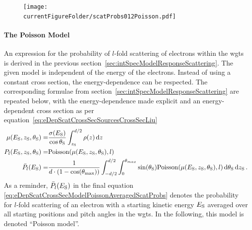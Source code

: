 \begin{figure}[th]
\texttt{[image: \\currentFigureFolder/scatProbs012Poisson.pdf]}
        \label{fig:eDepScatCrossSecModel}
\end{figure}

\paragraph{The Poisson Model}
An expression for the probability of $l$-fold scattering of electrons within the \gls{wgts} is derived in the previous section~\ref{sec:intSpecModelResponseScattering}. The given model is independent of the energy of the electrons. Instead of using a constant cross section, the energy-dependence can be respected. The corresponding formulae from section~\ref{sec:intSpecModelResponseScattering} are repeated below, with the energy-dependence made explicit and an energy-dependent cross section as per equation~\eqref{eq:eDepScatCrossSecSourcesCrossSecLiu}
\begin{subequations}
\label{eq:eDepScatCrossSecModelPoisson}
\begin{align}
    \mu(E_\mathrm{S},z_\mathrm{S},\theta_\mathrm{S}) =&
    \frac{\sigma(E_\mathrm{S})}{\cos\theta_\mathrm{S}}
    \int_{z_\mathrm{S}}^{d/2} \rho(z)\mathop{}\!\mathrm{d} z \label{eq:energydepScatProbsPoissonExpectedScatCount} \\
    P_l(E_\mathrm{S},z_\mathrm{S},\theta_\mathrm{S}) =&
    \mathrm{Poisson}(\mu(E_\mathrm{S},z_\mathrm{S},\theta_\mathrm{S}),l) \label{eq:eDepScatCrossSecModelPoissonNonAveragedScatProbs} \\
    \bar{P}_l(E_\mathrm{S}) =&
    \frac{1}{d \cdot (1-\cos(\theta_\mathrm{max}))} 
      \int_{-d/2}^{d/2}  
          \int_{0}^{\theta_{max}} 
            \sin(\theta_\mathrm{S})
            \mathrm{Poisson}(\mu(E_\mathrm{S},z_\mathrm{S},\theta_\mathrm{S}),l)
          \mathop{}\!\mathrm{d}\theta_\mathrm{S}
      \mathop{}\!\mathrm{d}z_\mathrm{S}
      \label{eq:eDepScatCrossSecModelPoissonAveragedScatProbs}
    \text{\,.}
\end{align}
\end{subequations}
As a reminder, $\bar{P}_l(E_\mathrm{S})$ in the final equation \eqref{eq:eDepScatCrossSecModelPoissonAveragedScatProbs} denotes the probability for $l$-fold scattering of an electron with a starting kinetic energy $E_\mathrm{S}$ averaged over all starting positions and pitch angles in the \gls{wgts}. In the following, this model is denoted ``Poisson model''. 

